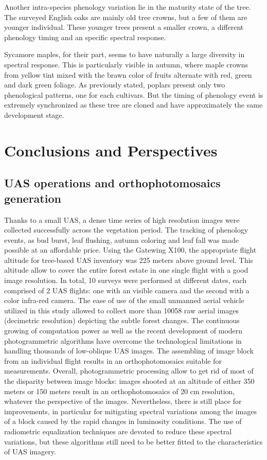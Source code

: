 \documentclass[remotesensing,article,submit,moreauthors,pdftex,12pt,a4paper]{mdpi} %
\begin{document}
Another intra-species phenology variation lie in the maturity state of the tree.
The surveyed English oaks are mainly old tree crowns, but a few of them are younger individual. 
These younger trees present a smaller crown, a different phenology timing and an specific spectral response. 

Sycamore maples, for their part, seems to have naturally a large diversity in spectral response. 
This is particularly visible in autumn, where maple crowns from yellow tint mixed with the brawn color of fruits alternate with red, green and dark green foliage. 
As previously stated, poplars present only two phenological patterns, one for each cultivars.
But the timing of phenology event is extremely synchronized as these tree are cloned and have approximately the same development stage.

\section{Conclusions and Perspectives}

\subsection{UAS operations and orthophotomosaics generation}

Thanks to a small UAS, a dense time series of high resolution images were collected successfully across the vegetation period. 
The tracking of phenology events, as bud burst, leaf flushing, autumn coloring and leaf fall was made possible at an affordable price. 
Using the Gatewing X100, the appropriate flight altitude for tree-based UAS inventory was 225 meters above ground level. 
This altitude allow to cover the entire forest estate in one single flight with a good image resolution. 
In total, 10 surveys were performed at different dates, each comprised of 2 UAS flights: one with an visible camera and the second with a color infra-red camera. 
The ease of use of the small unmanned aerial vehicle utilized in this study allowed to collect more than 10058 raw aerial images (decimetric resolution) depicting the subtle forest changes. 
The continuous growing of computation power as well as the recent development of modern photogrammetric algorithms have overcome the technological limitations in handling thousands of low-oblique UAS images. 
The assembling of image block from an individual flight results in an orthophotomosaics suitable for measurements. 
Overall, photogrammetric processing allow to get rid of most of the disparity between image blocks: images shooted at an altitude of either 350 meters or 150 meters result in an orthophotomosaics of 20 cm resolution, whatever the perspective of the images.
Nevertheless, there is still place for improvements, in particular for mitigating spectral variations among the images of a block caused by the rapid changes in luminosity conditions. 
The use of radiometric equalization techniques are devoted to reduce these spectral variations, but these algorithms still need to be better fitted to the characteristics of UAS imagery.
\end{document}
